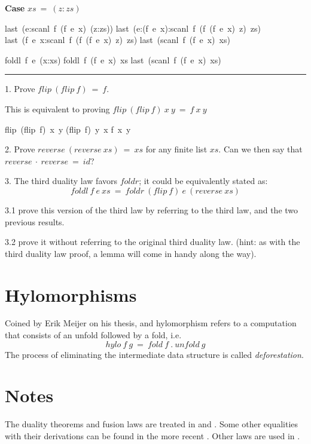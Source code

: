 \documentclass[twoside]{article}
\newenvironment{proof}{{\bf Proof:}}{\hfill\rule{2mm}{2mm}}
\begin{document}
\begin{proof}
\textbf{Case} $xs~=~(z:zs)$

\begin{minipage}[t]{.5\textwidth}
\begin{calculation}
  last~(e:scanl~f~(f~e~x)~(z:zs))
  last~(e:(f~e~x):scanl~f~(f~(f~e~x)~z)~zs)
  last~(f~e~x:scanl~f~(f~(f~e~x)~z)~zs)
  last~(scanl~f~(f~e~x)~xs)
\end{calculation}
\end{minipage}%
\begin{minipage}[t]{.4\textwidth}
\begin{calculation}
  foldl~f~e~(x:xs)
  foldl~f~(f~e~x)~xs
  last~(scanl~f~(f~e~x)~xs)
\end{calculation}
\end{minipage}

\end{proof}

1. Prove $flip~(flip~f)~=~f$.

This is equivalent to proving $flip~(flip~f)~x~y~=~f~x~y$

\begin{calculation}
  flip~(flip~f)~x~y
  (flip~f)~y~x
  f~x~y
\end{calculation}

2. Prove $reverse~(reverse~xs)~=~xs$ for any finite list $xs$.
   Can we then say that $reverse~\cdot~reverse~=~id$?

3. The third duality law favors $foldr$; it could be equivalently stated as:
$$foldl~f~e~xs~=~foldr~(flip~f)~e~(reverse~xs)$$

3.1 prove this version of the third law by referring to the third law, and
the two previous results.

3.2 prove it without referring to the original third duality law. (hint: as with
the third duality law proof, a lemma will come in handy along the way).

\section{Hylomorphisms}

Coined by Erik Meijer on his thesis, and hylomorphism refers to a
computation that consists of an unfold followed by a fold, i.e.
$$hylo~f~g~=~fold~f~.~unfold~g$$
The process of eliminating the intermediate data structure is called
\textit{deforestation}.

\section{Notes}

The duality theorems and fusion laws are treated in \cite{bw90} and \cite{b98}.
Some other equalities with their derivations can be found in the more recent
\cite{B14}. Other laws are used in \cite{b10}.



\end{document}
